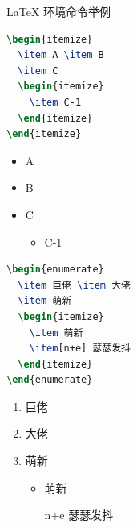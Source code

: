 \documentclass{ctexbeamer}
\begin{document}
\begin{frame}[fragile]{\LaTeX{} 环境命令举例}
	\begin{minipage}{0.5\linewidth}
		\begin{lstlisting}[language=TeX]
\begin{itemize}
  \item A \item B
  \item C
  \begin{itemize}
    \item C-1
  \end{itemize}
\end{itemize}
\end{lstlisting}
	\end{minipage}\hspace{1cm}
	\begin{minipage}{0.3\linewidth}
		\begin{itemize}
			\item A
			\item B
			\item C
			\begin{itemize}
				\item C-1
			\end{itemize}
		\end{itemize}
	\end{minipage}
	\medskip
\end{frame}


\begin{frame}[fragile]
	\begin{minipage}{0.5\linewidth}
		\begin{lstlisting}[language=TeX]
\begin{enumerate}
  \item 巨佬 \item 大佬
  \item 萌新
  \begin{itemize}
    \item 萌新
    \item[n+e] 瑟瑟发抖
  \end{itemize}
\end{enumerate}
\end{lstlisting}
	\end{minipage}\hspace{1cm}
	\begin{minipage}{0.3\linewidth}
		\begin{enumerate}
			\item 巨佬
			\item 大佬
			\item 萌新
			\begin{itemize}
				\item 萌新
				\item[n+e] 瑟瑟发抖
			\end{itemize}
		\end{enumerate}
	\end{minipage}
\end{frame}
\end{document}
